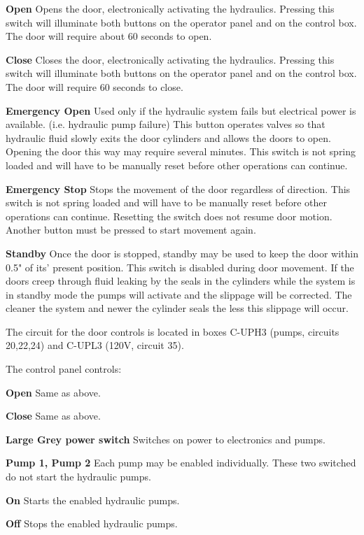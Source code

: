 \begin{obsolete}
\begin{description}
\item{\bf Open} Opens the door, electronically activating the hydraulics.
Pressing this switch will illuminate both buttons on the operator panel and
on the
control box. The door will require about 60 seconds to open.
\item{\bf Close} Closes the door, electronically activating the hydraulics.
Pressing this switch will illuminate both buttons on the operator panel and on
the control box. The door will require 60 seconds to close.
\item{\bf Emergency Open} Used only if the hydraulic system fails but electrical
power is available. (i.e. hydraulic pump failure) This button operates
valves so that hydraulic fluid slowly exits the door cylinders and allows the
doors to open. Opening the door this way may require several minutes.
This switch is not spring loaded and will have to be manually reset before
other operations can continue.
\item{\bf Emergency Stop} Stops the movement of the door regardless of
direction.
This switch is not spring loaded and will have to be manually reset before
other operations can continue. Resetting the switch does not resume door
motion. Another button must be pressed to start movement again.
\item{\bf Standby} Once the door is stopped, standby may be used to keep
the door
within 0.5" of its' present position. This switch is disabled during door
movement. If the doors creep through fluid leaking by the seals in the
cylinders while the system is in standby mode the pumps will activate and the
slippage will be corrected. The cleaner the system and newer the cylinder
seals the less this slippage will occur.
\end{description}

The circuit for the door controls is located in boxes C-UPH3 (pumps, circuits
20,22,24) and C-UPL3 (120V, circuit 35).

The control panel controls:

\begin{description}
\item{\bf Open} Same as above.
\item{\bf Close} Same as above.
\item{\bf Large Grey power switch} Switches on power to electronics and pumps.
\item{\bf Pump 1, Pump 2} Each pump may be enabled individually. These two
switched do not start the hydraulic pumps.
\item{\bf On} Starts the enabled hydraulic pumps.
\item{\bf Off} Stops the enabled hydraulic pumps.
\end{description}


\end{obsolete}
